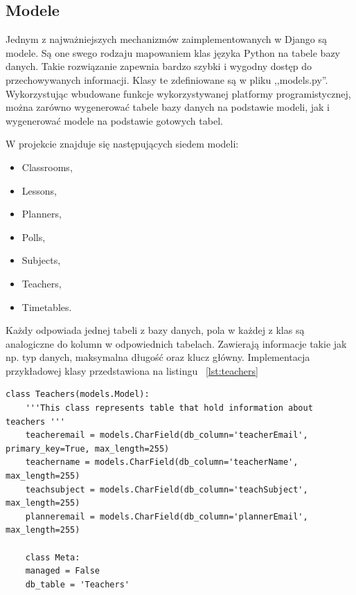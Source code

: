 \subsection{Modele}
Jednym z najważniejszych mechanizmów zaimplementowanych w Django są modele. Są one swego rodzaju mapowaniem klas języka Python na tabele bazy danych. Takie rozwiązanie zapewnia bardzo szybki i wygodny dostęp do przechowywanych informacji. Klasy te zdefiniowane są w pliku ,,models.py''. Wykorzystując wbudowane funkcje wykorzystywanej platformy programistycznej, można zarówno wygenerować tabele bazy danych na podstawie modeli, jak i wygenerować modele na podstawie gotowych tabel.

W projekcie znajduje się następujących siedem modeli: 
\begin{itemize}
	\item Classrooms,
	\item Lessons,
	\item Planners,
	\item Polls,
	\item Subjects,
	\item Teachers,
	\item Timetables.
\end{itemize}
Każdy odpowiada jednej tabeli z bazy danych, pola w każdej z klas są analogiczne do kolumn w odpowiednich tabelach. Zawierają informacje takie jak np. typ danych, maksymalna długość oraz klucz główny.
Implementacja przykładowej klasy przedstawiona na listingu ~\ref{lst:teachers}

\begin{lstlisting}[caption=Implementacja klasy Teachers, label={lst:teachers}]
	class Teachers(models.Model):
	'''This class represents table that hold information about teachers '''
	teacheremail = models.CharField(db_column='teacherEmail', primary_key=True, max_length=255)
	teachername = models.CharField(db_column='teacherName', max_length=255)
	teachsubject = models.CharField(db_column='teachSubject', max_length=255)
	planneremail = models.CharField(db_column='plannerEmail', max_length=255)
	
	class Meta:
	managed = False
	db_table = 'Teachers'
\end{lstlisting}

